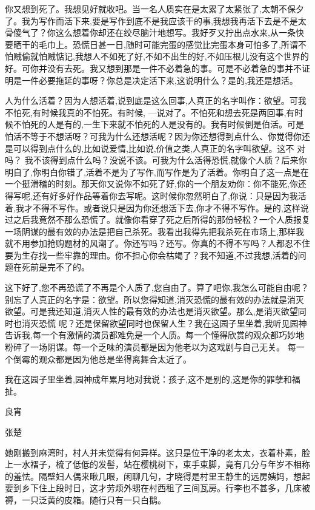 \documentclass{ctexart}
\newcommand{\blkx}{\vspace*{4\baselineskip} }
\renewcommand{\\}{\par}
\begin{document}
\\你又想到死了。我想见好就收吧。当一名人质实在是太累了太紧张了,太朝不保夕了。我为写作而活下来,要是写作到底不是我应该干的事,我想我再活下去是不是太骨傻气了？你这么想着你却还在绞尽脑汁地想写。我好歹又拧出点水来,从一条快要晒干的毛巾上。恐慌日甚一日,随时可能完蛋的感觉比完蛋本身可怕多了,所谓不怕贼偷就怕贼惦记,我想人不如死了好,不如不出生的好,不如压根儿没有这个世界的好。可你并没有去死。我又想到那是一件不必着急的事。可是不必着急的事并不证明是一件必要拖延的事呀？你总是决定活下来,这说明什么？是的,我还是想活。
\\人为什么活着？因为人想活着,说到底是这么回事,人真正的名字叫作：欲望。可我不怕死,有时候我真的不怕死。有时候, ---说对了。不怕死和想去死是两回事,有时候不怕死的人是有的,一生下来就不怕死的人是没有的。我有时候倒是伯活。可是怕活不等于不想活呀？可我为什么还想活呢？因为你还想得到点什么、你觉得你还是可以得到点什么的,比如说爱情,比如说,价值之类,人真正的名字叫欲望。这不 对吗？ 我不该得到点什么吗？没说不该。可我为什么活得恐慌,就像个人质？后来你明自了,你明白你错了,活着不是为了写作,而写作是为了活着。你明自了这一点是在一个挺滑稽的时刻。那天你又说你不如死了好,你的一个朋友劝你：你不能死,你还得写呢,还有好多好作品等着你去写呢。这时候你忽然明白了,你说：只是因为我活着,我才不得不写作。或者说只是因为你还想活下去,你才不得不写作。是的,这样说过之后我竟然不那么恐慌了。就像你看穿了死之后所得的那份轻松？一个人质报复一场阴谋的最有效的办法是把自己杀死。我看出我得先把我杀死在市场上,那样我就不用参加抢购题材的风潮了。你还写吗？还写。你真的不得不写吗？人都忍不住要为生存找一些牢靠的理由。你不担心你会枯竭了？我不知道,不过我想,活着的问题在死前是完不了的。
\\这下好了,您不再恐谎了不再是个人质了,您自由了。算了吧你,我怎么可能自由呢？别忘了人真正的名字是：欲望。所以您得知道,消灭恐慌的最有效的办法就是消灭欲望。可是我还知道,消灭人性的最有效的办法也是消灭欲望。那么,是消灭欲望同时也消灭恐慌 呢？还是保留欲望同时也保留人生？我在这园子里坐着,我听见园神告诉我,每一个有激情的演员都难免是一个人质。每一个懂得欣赏的观众都巧妙地粉碎了一场阴谋。每一个乏味的演员都是因为他老以为这戏剧与自己无关。 每一个倒霉的观众都是因为他总是坐得离舞合太近了。
\\我在这园子里坐着,园神成年累月地对我说：孩子,这不是别的,这是你的罪孽和福扯。
\blkx
\\\centerline{良宵}\\  \centerline{张楚}\\
她刚搬到麻湾时，村人并未觉得有何异样。这只是位干净的老太太，衣着朴素，脸上一水褶子，梳了低低的发髻，站在樱桃树下，束手束脚，竟有几分与年岁不相称的羞怯。隔壁妇人偶来瞅几眼，闲聊几句，才晓得是村里王静生的远房姨妈，想起要到乡下住上段时日，这才劳烦外甥在村西租了三间瓦房。行李也不甚多，几床被褥，一只泛黄的皮箱。随行只有一只白鹅。
\end{document}
